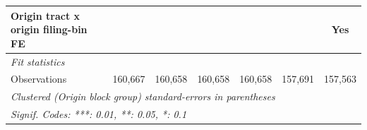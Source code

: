 \begin{tabular}{lcccccc}
   Origin tract x origin filing-bin FE            &                        &                &                       &                &                & Yes\\  
   \midrule
   \emph{Fit statistics}\\
   Observations                                   & 160,667                & 160,658        & 160,658               & 160,658        & 157,691        & 157,563\\  
   \midrule \midrule
   \multicolumn{7}{l}{\emph{Clustered (Origin block group) standard-errors in parentheses}}\\
   \multicolumn{7}{l}{\emph{Signif. Codes: ***: 0.01, **: 0.05, *: 0.1}}\\
\end{tabular}
\par\endgroup
